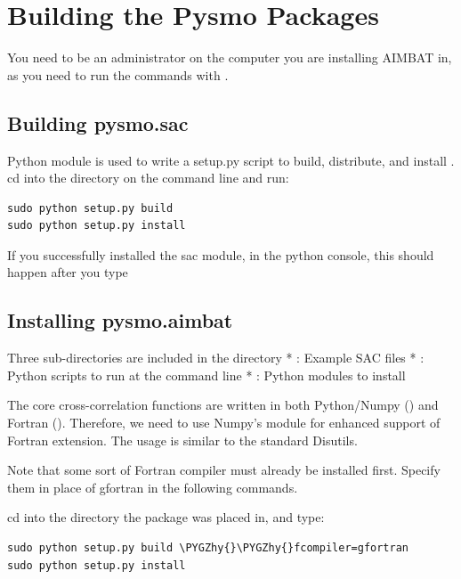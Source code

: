 \documentclass[letterpaper,10pt,english]{sphinxmanual}
\def\PYGZhy{\char`\-}
\begin{document}
\section{Building the Pysmo Packages}
\label{docfiles/install_aimbat:building-the-pysmo-packages}
You need to be an administrator on the computer you are installing AIMBAT in, as you need to run the commands with .


\subsection{Building pysmo.sac}
\label{docfiles/install_aimbat:building-pysmo-sac}
Python module  is used to write a setup.py script to build, distribute, and install . cd into the  directory on the command line and run:

\begin{Verbatim}[commandchars=\\\{\}]
sudo python setup.py build
sudo python setup.py install
\end{Verbatim}

If you successfully installed the sac module, in the python console, this should happen after you type 


\subsection{Installing pysmo.aimbat}
\label{docfiles/install_aimbat:installing-pysmo-aimbat}
Three sub-directories are included in the  directory
* : Example SAC files
* : Python scripts to run at the command line
* : Python modules to install

The core cross-correlation functions are written in both Python/Numpy () and Fortran (). Therefore, we need to use Numpy’s  module for enhanced support of Fortran extension. The usage is similar to the standard Disutils.

Note that some sort of Fortran compiler must already be installed first. Specify them in place of gfortran in the following commands.

cd into the directory the  package was placed in, and type:

\begin{Verbatim}[commandchars=\\\{\}]
sudo python setup.py build \PYGZhy{}\PYGZhy{}fcompiler=gfortran
sudo python setup.py install
\end{Verbatim}
\end{document}
